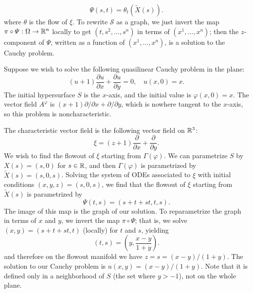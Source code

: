 \[\varPsi(s,t)=\theta_t(\widetilde{X}(s)).\]
where $\theta$ is the flow of $\xi$. To rewrite $\mathcal{S}$ as a graph, we just invert the map $\pi\circ\varPsi:\Omega\to\mathbb{R}^n$ locally to get $(t,s^2,\dots,s^n)$ in terms of $(x^1,\dots,x^n)$; then the $z$-component
of $\varPsi$, written as a function of $(x^1,\dots,x^n)$, is a solution to the Cauchy problem.
\begin{example}
Suppose we wish to solve the following quasilinear Cauchy problem in the plane:
\[(u+1)\frac{\partial u}{\partial x}+\frac{\partial u}{\partial y}=0,\quad u(x,0)=x.\]
The initial hypersurface $S$ is the $x$-axis, and the initial value is $\varphi(x,0)=x$. The vector field $A^\varphi$ is $(x+1)\partial/\partial x+\partial/\partial y$, which is nowhere tangent to the $x$-axis, so this problem is noncharacteristic.\par
The characteristic vector field is the following vector field on $\mathbb{R}^3$:
\[\xi=(z+1)\frac{\partial}{\partial x}+\frac{\partial}{\partial y}.\]
We wish to find the flowout of $\xi$ starting from $\Gamma(\varphi)$. We can parametrize $S$ by $X(s)=(s,0)$ for $s\in\mathbb{R}$, and then $\Gamma(\varphi)$ is parametrized by $\widetilde{X}(s)=(s,0,s)$. Solving the system of ODEs associated to $\xi$ with initial conditions $(x,y,z)=(s,0,s)$, we
find that the flowout of $\xi$ starting from $\widetilde{X}(s)$ is parametrized by
\[\varPsi(t,s)=(s+t+st,t,s).\]
The image of this map is the graph of our solution. To reparametrize the graph in terms of $x$ and $y$, we invert the map $\pi\circ\varPsi$; that is, we solve $(x,y)=(s+t+st,t)$ (locally) for $t$ and $s$, yielding
\[(t,s)=(y,\frac{x-y}{1+y}).\]
and therefore on the flowout manifold we have $z=s=(x-y)/(1+y)$. The solution to our Cauchy problem is $u(x,y)=(x-y)/(1+y)$. Note that it is defined only in a neighborhood of $S$ (the set where $y>-1$), not on the whole plane.
\end{example}
